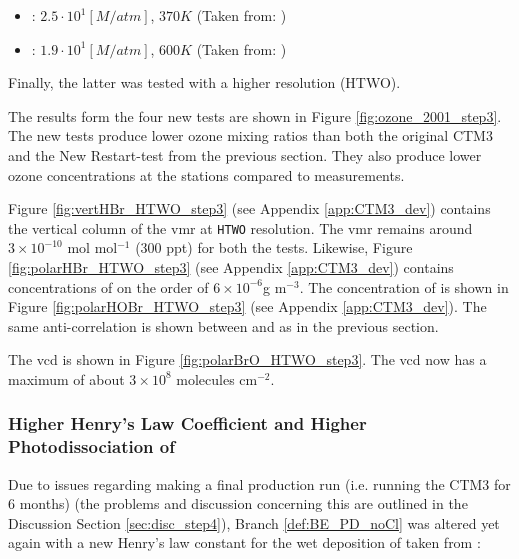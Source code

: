 \begin{itemize}
    \item {}: $2.5 \cdot 10^{1} [M/atm]$, $370 K$ (Taken from: \cite{dean1999})
    \item {}: $1.9\cdot10^1 [M/atm]$, $600 K$ (Taken from: \cite{dean1999})
\end{itemize}

Finally, the latter was tested with a higher resolution (HTWO). 

\medskip

The results form the four new tests are shown in Figure \ref{fig:ozone_2001_step3}. The new tests produce lower ozone mixing ratios than both the original CTM3 and the New Restart-test from the previous section. They also produce lower ozone concentrations at the stations compared to measurements. 





\medskip

Figure \ref{fig:vertHBr_HTWO_step3} (see Appendix \ref{app:CTM3_dev}) contains the vertical column of the  \acrshort{vmr} at \texttt{HTWO} resolution. The \acrshort{vmr} remains around $3\times10^{-10}$ mol mol$^{-1}$ (300 ppt) for both the tests. Likewise, Figure \ref{fig:polarHBr_HTWO_step3} (see Appendix \ref{app:CTM3_dev}) contains concentrations of  on the order of $6\times10^{-6} $g m$^{-3}$. The concentration of  is shown in Figure \ref{fig:polarHOBr_HTWO_step3} (see Appendix \ref{app:CTM3_dev}). The same anti-correlation is shown between  and  as in the previous section. 

\medskip

The  \acrshort{vcd} is shown in Figure \ref{fig:polarBrO_HTWO_step3}. The  \acrshort{vcd} now has a maximum of about $3\times10^8$ molecules cm$^{-2}$. 

\subsubsection{Higher Henry's Law Coefficient and Higher Photodissociation of }\label{sec:res_step4}

Due to issues regarding making a final production run (i.e. running the CTM3 for 6 months) (the problems and discussion concerning this are outlined in the Discussion Section \ref{sec:disc_step4}), Branch \ref{def:BE_PD_noCl} was altered yet again with a new Henry's law constant for the wet deposition of  taken from \cite{Sander99}: 

